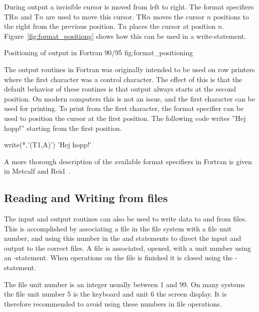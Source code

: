 During output a invisible cursor is moved from left to right. The format specifiers TR$n$ and T$n$ are used to move this cursor. TR$n$ moves the cursor $n$ positions to the right from the previous position. T$n$ places the cursor at position $n$. Figure~\ref{fig:format_positiong} shows how this can be used in a write-statement.

 {Positioning of output in Fortran
90/95} {fig:format_positioning}

The output routines in Fortran was originally intended to be used on row printers where the first character was a control character. The effect of this is that the default behavior of these routines is that output always starts at the second position. On modern computers this is not an issue, and the first character can be used for printing. To print from the first character, the format specifier  can be used to position the cursor at the first position. The following code writes ''Hej hopp!'' starting from the first position.

\begin{fortrancodeenv}
write(*,'(T1,A)') 'Hej hopp!'
\end{fortrancodeenv}

A more thorough description of the available format specifiers in Fortran is given in Metcalf and Reid~\cite{metcalf00}.

\subsection{Reading and Writing from files}

The input and output routines can also be used to write data to and from files. This is accomplished by associating a file in the file system with a file unit number, and using this number in the  and  statements to direct the input and output to the correct files. A file is associated, opened, with a unit number using an -statement. When operations on the file is finished it is closed using the
-statement.

The file unit number is an integer usually between 1 and 99. On many systems the file unit number 5 is the keyboard and unit 6 the screen display. It is therefore recommended to avoid using these numbers in file operations.

